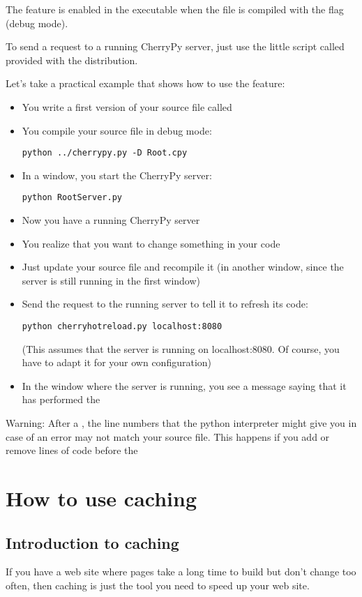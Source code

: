 \documentclass{manual}
\begin{document}
The  feature is enabled in the executable when the file is compiled with the  flag (debug mode).

To send a  request to a running CherryPy server, just use the little script called 
provided with the distribution.

Let's take a practical example that shows how to use the  feature:
\begin{itemize}
\item
You write a first version of your source file called 
\item
You compile your source file in debug mode:
\begin{verbatim}
python ../cherrypy.py -D Root.cpy
\end{verbatim}
\item
In a window, you start the CherryPy server:
\begin{verbatim}
python RootServer.py
\end{verbatim}
\item
Now you have a running CherryPy server
\item
You realize that you want to change something in your code
\item
Just update your source file and recompile it (in another window, since the server is still running in the first window)
\item
Send the  request to the running server to tell it to refresh its code:
\begin{verbatim}
python cherryhotreload.py localhost:8080
\end{verbatim}
(This assumes that the server is running on localhost:8080. Of course, you have to adapt it for your own configuration)
\item
In the window where the server is running, you see a message saying that it has performed the 
\end{itemize}
Warning: After a , the line numbers that the python interpreter might give you in case of an error
may not match your source file. This happens if you add or remove lines of code before the 

\chapter{How to use caching}
\section{Introduction to caching}
If you have a web site where pages take a long time to build but don't change too often, then caching is just the tool you
need to speed up your web site.
\end{document}

